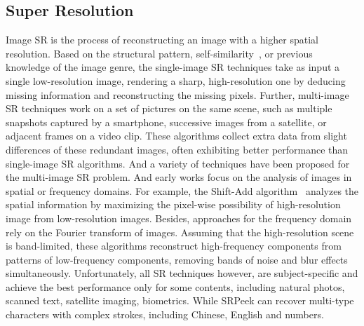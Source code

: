 \subsection{Super Resolution}
Image SR is the process of reconstructing an image with a higher spatial resolution. Based on the structural pattern, self-similarity~\cite{suetake2008image}, or previous knowledge of the image genre, the single-image SR techniques take as input a single low-resolution image, rendering a sharp, high-resolution one by deducing missing information and reconstructing the missing pixels. Further, multi-image SR techniques work on a set of pictures on the same scene, such as multiple snapshots captured by a smartphone, successive images from a satellite, or adjacent frames on a video clip. These algorithms collect extra data from slight differences of these redundant images, often exhibiting better performance than single-image SR algorithms. And a variety of techniques have been proposed for the multi-image SR problem. And early works focus on the analysis of images in spatial or frequency domains. For example, the Shift-Add algorithm~\cite{farsiu2003robust} analyzes the spatial information by maximizing the pixel-wise possibility of high-resolution image from low-resolution images. Besides, approaches for the frequency domain rely on the Fourier transform of images. Assuming that the high-resolution scene is band-limited, these algorithms reconstruct high-frequency components from patterns of low-frequency components, removing bands of noise and blur effects simultaneously. Unfortunately, all SR techniques  however, are subject-specific and achieve the best performance only for some contents, including natural photos, scanned text, satellite imaging, biometrics. While \textsf{SRPeek} can recover multi-type characters with complex strokes, including Chinese, English and numbers.

